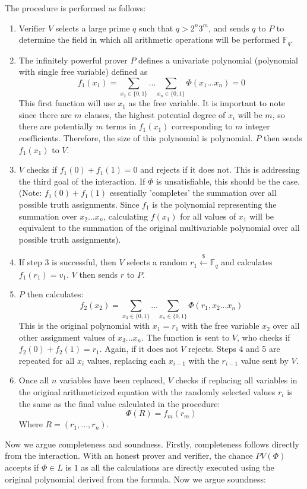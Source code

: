 \documentclass[11pt]{article}
\begin{document}
The procedure is performed as follows:
\begin{enumerate}
    \item Verifier $V$ selects a large prime $q$ such that $q > 2^n3^m$, and sends $q$ to $P$ to determine the field in which all arithmetic operations will be performed $\mathbb{F}_q$.
    \item The infinitely powerful prover $P$ defines a univariate polynomial (polynomial with single free variable) defined as $$f_1(x_1) = \sum\limits_{x_2 \in \{0,1\}}...\sum\limits_{x_n \in \{0,1\}} \Phi(x_1...x_n) = 0$$This first function will use $x_1$ as the free variable. It is important to note since there are $m$ clauses, the highest potential degree of $x_i$ will be $m$, so there are potentially $m$ terms in $f_1(x_1)$ corresponding to  $m$ integer coefficients. Therefore, the size of this polynomial is polynomial. $P$ then sends $f_1(x_1)$ to $V$.
    \item $V$ checks if $f_1(0) + f_1(1) = 0$ and rejects if it does not. This is addressing the third goal of the interaction. If $\Phi$ is unsatisfiable, this should be the case. (Note: $f_1(0) + f_1(1)$ essentially 'completes' the summation over all possible truth assignments. Since $f_1$ is the polynomial representing the summation over $x_2...x_n$, calculating $f(x_1)$ for all values of $x_1$ will be equivalent to the summation of the original multivariable polynomial over all possible truth assignments).
    \item If step 3 is successful, then $V$ selects a random $r_1 \overset{\$}{\leftarrow} \mathbb{F}_q$ and calculates $f_1(r_1) = v_1$. $V$ then sends $r$ to $P$.
    \item $P$ then calculates: $$f_2(x_2) = \sum\limits_{x_3 \in \{0,1\}}...\sum\limits_{x_n \in \{0,1\}} \Phi(r_1,x_2...x_n)$$ This is the original polynomial with $x_1=r_1$ with the free variable $x_2$ over all other assignment values of $x_3...x_n$. The function is sent to $V$, who checks if $f_2(0) + f_2(1) = r_1$. Again, if it does not $V$ rejects. Steps 4 and 5 are repeated for all $x_i$ values, replacing each $x_{i-1}$ with the $r_{i-1}$ value sent by $V$.
    \item Once all $n$ variables have been replaced, $V$ checks if replacing all variables in the original arithmeticized equation with the randomly selected values $r_i$ is the same as the final value calculated in the procedure:$$\Phi(R) = f_m(r_m)$$ Where $R = (r_1,...,r_n)$.
\end{enumerate}
Now we argue completeness and soundness. Firstly, completeness follows directly from the interaction. With an honest prover and verifier, the chance $PV(\Phi)$ accepts if $\Phi \in L$ is $1$ as all the calculations are directly executed using the original polynomial derived from the formula. Now we argue soundness:
\vspace{1em}
\end{document}

